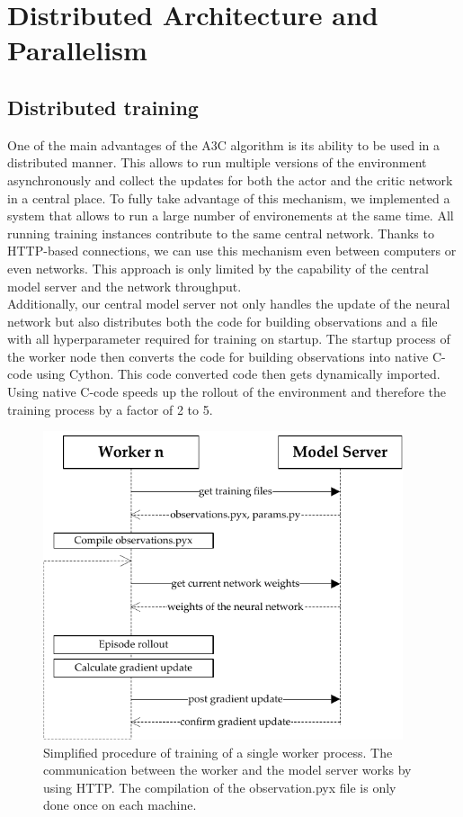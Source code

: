 \section[Distributed Training]{Distributed Architecture and Parallelism}\label{dist_architecture}
\subsection*{Distributed training}
One of the main advantages of the A3C algorithm is its ability to be used in a distributed manner. This allows to run multiple versions of the environment asynchronously and collect the updates for both the actor and the critic network in a central place. To fully take advantage of this mechanism, we implemented a system that allows to run a large number of environements at the same time. All running training instances contribute to the same central network. Thanks to HTTP-based connections, we can use this mechanism even between computers or even networks. This approach is only limited by the capability of the central model server and the network throughput.\\
Additionally, our central model server not only handles the update of the neural network but also distributes both the code for building observations and a file with all hyperparameter required for training on startup. The startup process of the worker node then converts the code for building observations into native C-code using Cython. This code converted code then gets dynamically imported.\\
Using native C-code speeds up the rollout of the environment and therefore the training process by a factor of 2 to 5.
\begin{figure}[H]
	\centering
	\includegraphics[width=300pt]{diagrams/distributed_training_update.pdf}
	\caption{Simplified procedure of training of a single worker process. The communication between the worker and the model server works by using HTTP. The compilation of the observation.pyx file is only done once on each machine.}
	\label{obs_descr}
\end{figure}
